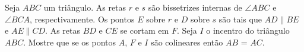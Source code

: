 Seja $ABC$ um triângulo. As retas $r$ e $s$ são bissetrizes internas de $\angle ABC$ e $\angle BCA$,
respectivamente. Os pontos $E$ sobre $r$ e $D$ sobre $s$ são tais que $AD \parallel BE$ e $AE \parallel CD$. As retas $BD$ e $CE$ se cortam
em $F$. Seja $I$ o incentro do triângulo $ABC$. Mostre que se os pontos $A$, $F$ e $I$ são colineares então $AB$ = $AC$.